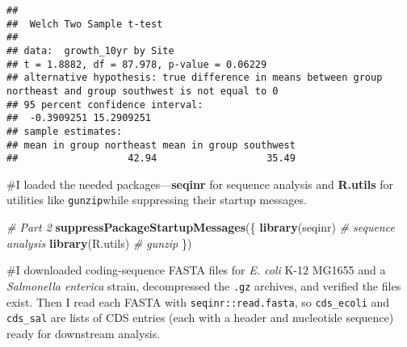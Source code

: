 \documentclass[
]{article}
\newenvironment{Shaded}{\begin{snugshade}}{\end{snugshade}}
\newcommand{\CommentTok}[1]{\textcolor[rgb]{0.56,0.35,0.01}{\textit{#1}}}
\newcommand{\FunctionTok}[1]{\textcolor[rgb]{0.13,0.29,0.53}{\textbf{#1}}}
\newcommand{\NormalTok}[1]{#1}
\begin{document}
\begin{verbatim}
## 
##  Welch Two Sample t-test
## 
## data:  growth_10yr by Site
## t = 1.8882, df = 87.978, p-value = 0.06229
## alternative hypothesis: true difference in means between group northeast and group southwest is not equal to 0
## 95 percent confidence interval:
##  -0.3909251 15.2909251
## sample estimates:
## mean in group northeast mean in group southwest 
##                   42.94                   35.49
\end{verbatim}

\#I loaded the needed packages---\textbf{seqinr} for sequence analysis
and \textbf{R.utils} for utilities like \texttt{gunzip}while suppressing
their startup messages.

\begin{Shaded}
\begin{Highlighting}[]
\CommentTok{\# Part 2}
\FunctionTok{suppressPackageStartupMessages}\NormalTok{(\{}
  \FunctionTok{library}\NormalTok{(seqinr)   }\CommentTok{\# sequence analysis}
  \FunctionTok{library}\NormalTok{(R.utils)  }\CommentTok{\# gunzip}
\NormalTok{\})}
\end{Highlighting}
\end{Shaded}

\#I downloaded coding-sequence FASTA files for \emph{E. coli} K-12
MG1655 and a \emph{Salmonella enterica} strain, decompressed the
\texttt{.gz} archives, and verified the files exist. Then I read each
FASTA with \texttt{seqinr::read.fasta}, so \texttt{cds\_ecoli} and
\texttt{cds\_sal} are lists of CDS entries (each with a header and
nucleotide sequence) ready for downstream analysis.
\end{document}
